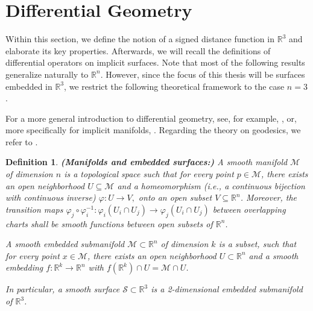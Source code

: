 \documentclass[12pt,openany]{book}
\newcommand{\R}{\mathbb{R}}
\theoremstyle{plainnormal}
\newtheorem{definition}[theorem]{Definition}
\theoremstyle{remark}
\begin{document}
\section{Differential Geometry}
Within this section, we define the notion of a signed distance function in $\R^3$ and elaborate its key properties. Afterwards, we will recall the definitions of differential operators on implicit surfaces. Note that most of the following results generalize naturally to $\R^n$. However, since the focus of this thesis will be surfaces embedded in $\R^3$, we restrict the following theoretical framework to the case $n=3$.\par
For a more general introduction to differential geometry, see, for example, \cite{Lee00}, or, more specifically for implicit manifolds, \cite{Dziuk_Elliott_2013}. Regarding the theory on geodesics, we refer to \cite{Dacorogna}.
\begin{definition}\textbf{(Manifolds and embedded surfaces:)}
A \emph{smooth manifold} \(\mathcal{M}\) of dimension \(n\) is a topological space such that for every point \(p \in \mathcal{M}\), there exists an open neighborhood \(U \subseteq \mathcal{M}\) and a homeomorphism (i.e., a continuous bijection with continuous inverse) 
\(
\varphi: U \to V,
\)
onto an open subset \(V \subseteq \mathbb{R}^n\). Moreover, the \emph{transition maps} 
\(
\varphi_j \circ \varphi_i^{-1} : \varphi_i(U_i \cap U_j) \to \varphi_j(U_i \cap U_j)
\)
between overlapping charts shall be smooth functions between open subsets of \(\mathbb{R}^n\).
\par
A \emph{smooth embedded submanifold} \(\mathcal{M} \subset \mathbb{R}^n\) of dimension \(k\) is a subset, such that for every point \(x \in \mathcal{M}\), there exists an open neighborhood \(U \subset \mathbb{R}^n\) and a smooth embedding \(f: \mathbb{R}^k \to \mathbb{R}^n\) with \(f(\mathbb{R}^k) \cap U = \mathcal{M} \cap U\).\par
In particular, a \emph{smooth surface} \(\mathcal{S} \subset \mathbb{R}^3\) is a 2-dimensional embedded submanifold of \(\mathbb{R}^3\).
\end{definition}
\end{document}
